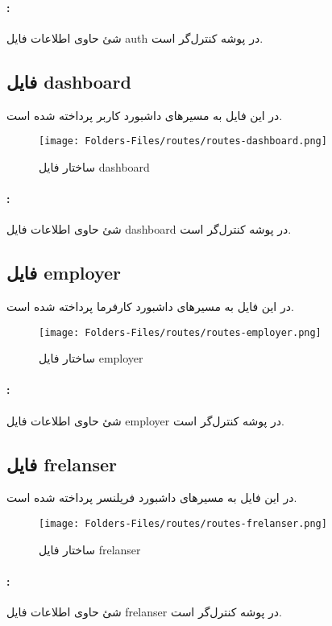 \paragraph{:}
شئ حاوی اطلاعات فایل auth در پوشه کنترل‌گر است.

\subsection{فایل dashboard}
در این فایل به مسیرهای داشبورد کاربر پرداخته شده است.
\begin{figure}[H]
	\texttt{[image: Folders-Files/routes/routes-dashboard.png]}
	\centering
	\caption{ساختار فایل dashboard}
	\label{fig:file:routes:dashboard}
\end{figure}
\paragraph{:}
شئ حاوی اطلاعات فایل dashboard در پوشه کنترل‌گر است.

\subsection{فایل employer}
در این فایل به مسیرهای داشبورد کارفرما پرداخته شده است.
\begin{figure}[H]
	\texttt{[image: Folders-Files/routes/routes-employer.png]}
	\centering
	\caption{ساختار فایل employer}
	\label{fig:file:routes:employer}
\end{figure}
\paragraph{:}
شئ حاوی اطلاعات فایل employer در پوشه کنترل‌گر است.

\subsection{فایل frelanser}
در این فایل به مسیرهای داشبورد فریلنسر پرداخته شده است.
\begin{figure}[H]
	\texttt{[image: Folders-Files/routes/routes-frelanser.png]}
	\centering
	\caption{ساختار فایل frelanser}
	\label{fig:file:routes:frelanser}
\end{figure}
\paragraph{:}
شئ حاوی اطلاعات فایل frelanser در پوشه کنترل‌گر است.

